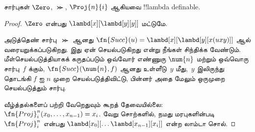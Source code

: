 \documentclass[../../../include/open-logic-section]{subfiles}
\begin{document}

\begin{lem}
சார்புகள் $\Zero$, $\Succ$, $\Proj{n}{i}$ ஆகியவை !!{lambda definable}.
\end{lem}

\begin{proof}
$\Zero$ என்பது $\lambd[x][\lambd[y][y]]$ மட்டுமே.

அடுத்தெண் சார்பு~$\Succ$ ஆனது
$\fn{Succ}(u) = \lambd[x][\lambd[y][x(uxy)]]$ ஆல் வரையறுக்கப்படுகிறது.
இது ஏன் செயல்படுகிறது என்று நீங்கள் சிந்திக்க வேண்டும். மீள்செயல்படுத்தியாகக்
கருதப்படும் ஒவ்வோர் எண்ணுரு $\num{n}$ மற்றும் ஒவ்வொரு சார்பு~$f$ க்கும்,
$\fn{Succ}(\num{n},f)$ ஆனது உள்ளீடு~$y$ மீது,~$y$ இலிருந்து தொடங்கி $f$ ஐ
$n$ முறை செயல்படுத்திவிட்டு, பின்னர் அதை மேலும் ஒருமுறை செயல்படுத்தும் சார்பு.

வீழ்த்தல்களைப் பற்றி வேறெதுவும் கூறத் தேவையில்லை:
$\fn{Proj}^n_i(x_0, \dots, x_{n-1}) = x_i$. வேறு சொற்களில், நமது
மரபுகளின்படி $\fn{Proj}^n_i$ என்பது
$\lambd[x_0][\dots \lambd[x_{n-1}][x_i]]$ என்ற லாம்டா சொல்.
\end{proof}
\end{document}
